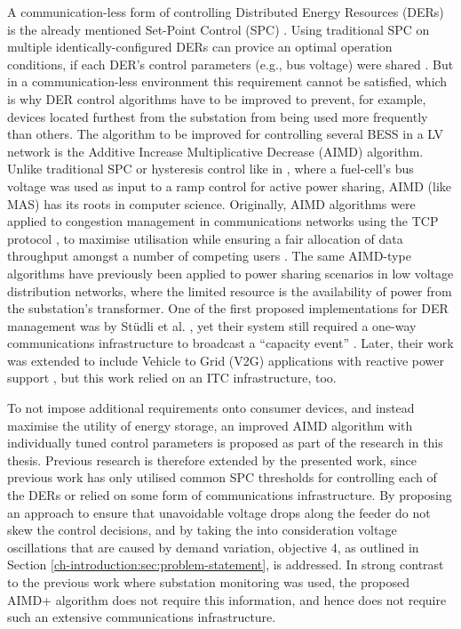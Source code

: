 A communication-less form of controlling Distributed Energy Resources (DERs) is the already mentioned Set-Point Control (SPC) \cite{Leadbetter2012}.
Using traditional SPC on multiple identically-configured DERs can provice an optimal operation conditions, if each DER's control parameters (e.g., bus voltage) were shared \cite{Thieblemont2017a}.
But in a communication-less environment this requirement cannot be satisfied, which is why DER control algorithms have to be improved to prevent, for example, devices located furthest from the substation from being used more frequently than others.
The algorithm to be improved for controlling several BESS in a LV network is the Additive Increase Multiplicative Decrease (AIMD) algorithm.
Unlike traditional SPC or hysteresis control like in \cite{Jiang2007}, where a fuel-cell's bus voltage was used as input to a ramp control for active power sharing, AIMD (like MAS) has its roots in computer science.
Originally, AIMD algorithms were applied to congestion management in communications networks using the TCP protocol \cite{Chiu1989}, to maximise utilisation while ensuring a fair allocation of data throughput amongst a number of competing users \cite{Wirth2014}.
The same AIMD-type algorithms have previously been applied to power sharing scenarios in low voltage distribution networks, where the limited resource is the availability of power from the substation's transformer.
One of the first proposed implementations for DER management was by St{\"{u}}dli et al. \cite{Studli2012}, yet their system still required a one-way communications infrastructure to broadcast a ``capacity event'' \cite{Studli2014, Studli2014a}.
Later, their work was extended to include Vehicle to Grid (V2G) applications with reactive power support \cite {Studli2015}, but this work relied on an ITC infrastructure, too.

To not impose additional requirements onto consumer devices, and instead maximise the utility of energy storage, an improved AIMD algorithm with individually tuned control parameters is proposed as part of the research in this thesis.
Previous research is therefore extended by the presented work, since previous work has only utilised common SPC thresholds for controlling each of the DERs or relied on some form of communications infrastructure.
By proposing an approach to ensure that unavoidable voltage drops along the feeder do not skew the control decisions, and by taking the into consideration voltage oscillations that are caused by demand variation, objective 4, as outlined in Section \ref{ch-introduction:sec:problem-statement}, is addressed.
In strong contrast to the previous work where substation monitoring was used, the proposed AIMD+ algorithm does not require this information, and hence does not require such an extensive communications infrastructure.
